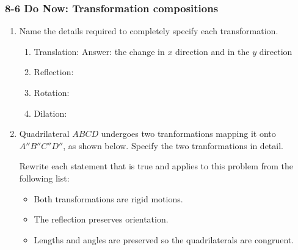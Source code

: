 \documentclass[12pt, twoside]{article}
\begin{document}
\subsubsection*{8-6 Do Now: Transformation compositions}
  \begin{enumerate}
    \item Name the details required to completely specify each transformation.
    \begin{enumerate}
      \item Translation: Answer: the change in $x$ direction and in the $y$ direction
      \item Reflection: \vspace{0.8cm}
      \item Rotation: \vspace{0.8cm}
      \item Dilation:
    \end{enumerate} \vspace{0.5cm}

  \item Quadrilateral $ABCD$ undergoes two tranformations mapping it onto $A''B''C''D''$, as shown below. Specify the two tranformations in detail.
    \vspace{1.75cm}

      \begin{center} %
      \end{center}
    Rewrite each statement that is true and applies to this problem from the following list:
    \begin{itemize}
      \item Both transformations are rigid motions.
      \item The reflection preserves orientation.
      \item Lengths and angles are preserved so the quadrilaterals are congruent.
    \end{itemize}

  \end{enumerate}

  
\end{document}
